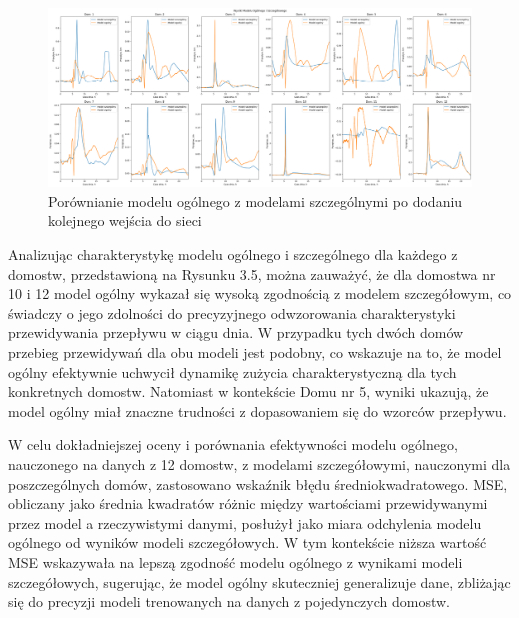 \documentclass[a4paper,twoside,12pt]{book}
\begin{document}
\newpage

\begin{figure}[!h]
  \centering
  \includegraphics[width=1\textwidth]{img/szczegółowy_ogolny_porówniaie_dodatkowy.png}
  \caption{Porównianie modelu ogólnego z modelami szczególnymi po dodaniu kolejnego wejścia do sieci}
  \label{fig:etykieta-rysunku}
\end{figure}

Analizując charakterystykę modelu ogólnego i szczególnego dla każdego z domostw, przedstawioną na Rysunku 3.5, można zauważyć, że dla domostwa nr 10 i 12 model ogólny wykazał się wysoką zgodnością z modelem szczegółowym, co świadczy o jego zdolności do precyzyjnego odwzorowania charakterystyki przewidywania przepływu w ciągu dnia. W przypadku tych dwóch domów przebieg przewidywań dla obu modeli jest podobny, co wskazuje na to, że model ogólny efektywnie uchwycił dynamikę zużycia charakterystyczną dla tych konkretnych domostw. Natomiast w kontekście Domu nr 5, wyniki ukazują, że model ogólny miał znaczne trudności z dopasowaniem się do wzorców przepływu.

W celu dokładniejszej oceny i porównania efektywności modelu ogólnego, nauczonego na danych z 12 domostw, z modelami szczegółowymi, nauczonymi dla poszczególnych domów, zastosowano wskaźnik błędu średniokwadratowego. MSE, obliczany jako średnia kwadratów różnic między wartościami przewidywanymi przez model a rzeczywistymi danymi, posłużył jako miara odchylenia modelu ogólnego od wyników modeli szczegółowych. W tym kontekście niższa wartość MSE wskazywała na lepszą zgodność modelu ogólnego z wynikami modeli szczegółowych, sugerując, że model ogólny skuteczniej generalizuje dane, zbliżając się do precyzji modeli trenowanych na danych z pojedynczych domostw.
\end{document}
